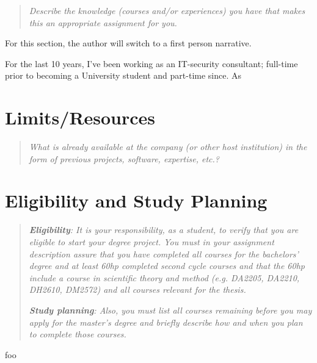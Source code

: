 \documentclass[12pt, a4paper]{article}
\begin{document}
\begin{quote}
	\textit{Describe the knowledge (courses and/or experiences) you have that makes this an appropriate assignment for you.}
\end{quote}

For this section, the author will switch to a first person narrative.

For the last 10 years, I've been working as an IT-security consultant; full-time prior to becoming a University student and part-time since. As 

\section{Limits/Resources}

\begin{quote}
	\textit{What is already available at the company (or other host institution) in the form of previous projects, software, expertise, etc.?}
\end{quote}



\section{Eligibility and Study Planning}

\begin{quote}
	\textit{\textbf{Eligibility}: It is your responsibility, as a student, to verify that you are eligible to start your degree project. You must in your assignment description assure that you have completed all courses for the bachelors' degree and at least 60hp completed second cycle courses and that the 60hp include a course in scientific theory and method (e.g. DA2205, DA2210, DH2610, DM2572) and all courses relevant for the thesis.}

	\textit{\textbf{Study planning}: Also, you must list all courses remaining before you may apply for the master's degree and briefly describe how and when you plan to complete those courses.}
\end{quote}



foo \cite{evaluation_of_irs}






%
\end{document}
